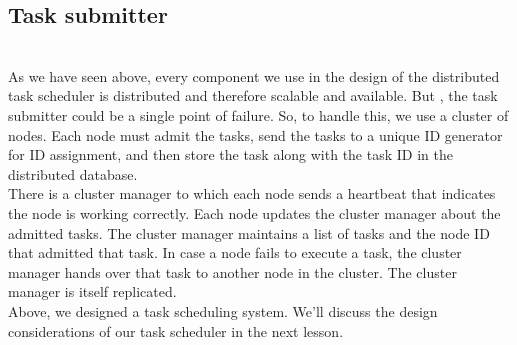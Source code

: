 \subsection{Task submitter}\label{ERyJE69N_QDVujfKVr8mG}
\\
As we have seen above, every component we use in the design of the distributed task scheduler is distributed and therefore scalable and available. But , the task submitter could be a single point of failure. So, to handle this, we use a cluster of nodes. Each node must admit the tasks, send the tasks to a unique ID generator for ID assignment, and then store the task along with the task ID in the distributed database.
\\
There is a cluster manager to which each node sends a heartbeat that indicates the node is working correctly. Each node updates the cluster manager about the admitted tasks. The cluster manager maintains a list of tasks and the node ID that admitted that task. In case a node fails to execute a task, the cluster manager hands over that task to another node in the cluster. The cluster manager is itself replicated.
\\
Above, we designed a task scheduling system. We'll discuss the design considerations of our task scheduler in the next lesson.

